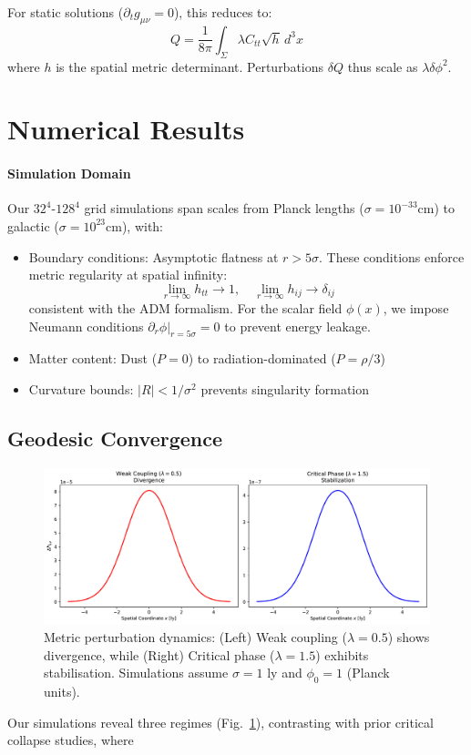 \documentclass[twocolumn]{article}
\begin{document}
	For static solutions ($\partial_t g_{\mu\nu} = 0$), this reduces to:
	\begin{equation}
		Q = \frac{1}{8\pi} \int_\Sigma \lambda C_{tt} \sqrt{h} \, d^3x
	\end{equation}
	where $h$ is the spatial metric determinant. Perturbations $\delta Q$ thus scale as $\lambda \delta\phi^2$.
	
	\FloatBarrier%
	\section{Numerical Results}\label{sec:numerical}
	
	\paragraph{Simulation Domain}
	Our $32^4$-$128^4$ grid simulations span scales from Planck lengths ($\sigma=10^{-33}$cm) to galactic ($\sigma=10^{23}$cm), with:  
	\begin{itemize}
		\item Boundary conditions: Asymptotic flatness at $r>5\sigma$. These conditions enforce metric regularity at spatial infinity:
		\begin{equation}
			\lim_{r \to \infty} h_{tt} \to 1, \quad \lim_{r \to \infty} h_{ij} \to \delta_{ij}
		\end{equation}
		consistent with the ADM formalism\cite{york1972}. For the scalar field $\phi(x)$, we impose Neumann conditions $\partial_r \phi|_{r=5\sigma} = 0$ to prevent energy leakage.
		\item Matter content: Dust ($P=0$) to radiation-dominated ($P=\rho/3$)  
		\item Curvature bounds: $|R| < 1/\sigma^2$ prevents singularity formation  
	\end{itemize}
	
	\subsection{Geodesic Convergence}\label{subsec:geodesics}
	
	\begin{figure}[htbp]
		\centering
		\includegraphics[width=0.95\linewidth]{figures/phase_comparison.pdf}
		\caption{
			Metric perturbation dynamics: (Left) Weak coupling ($\lambda = 0.5$) shows divergence, while (Right) Critical phase ($\lambda = 1.5$) exhibits stabilisation. Simulations assume $\sigma = 1$ ly and $\phi_0 = 1$ (Planck units).
		}\label{fig:dynamics}
	\end{figure}
	Our simulations reveal three regimes (Fig.~\ref{fig:dynamics}), contrasting with prior critical collapse studies\cite{Choptuik1993}, where
	
\end{document}
